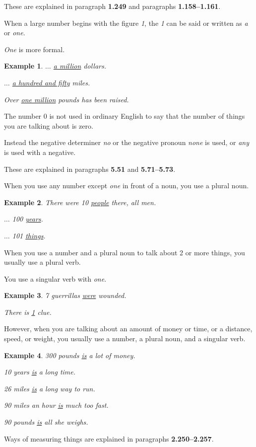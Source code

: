 \documentclass[oneside]{book}
\numberwithin{equation}{section}
\newtheorem{example}{Example}[section]
\begin{document}
These are explained in paragraph \textbf{1.249} and paragraphs \textbf{1.158--1.161}.

%
\noindent{} When a large number begins with the figure \textit{1}, the \textit{1} can be said or written as \textit{a} or \textit{one}.

\textit{One} is more formal.
\begin{example}
    $\ldots$ \underline{a million} dollars.
    
    $\ldots$ \underline{a hundred and fifty} miles.
    
    Over \underline{one million} pounds has been raised.
\end{example}
%
\noindent{} The number 0 is not used in ordinary English to say that the number of things you are talking about is zero.

Instead the negative determiner \textit{no} or the negative pronoun \textit{none} is used, or \textit{any} is used with a negative.

These are explained in paragraphs \textbf{5.51} and \textbf{5.71--5.73}.

%
\noindent{} When you use any number except \textit{one} in front of a noun, you use a plural noun.
\begin{example}
    There were 10 \underline{people} there, all men.
    
    $\ldots$ 100 \underline{years}.
    
    $\ldots$ 101 \underline{things}.
\end{example}
%
\noindent{} When you use a number and a plural noun to talk about 2 or more things, you usually use a plural verb.

You use a singular verb with \textit{one}.
\begin{example}
    7 guerrillas \underline{were} wounded.
    
    There is \underline{1} clue.
\end{example}
However, when you are talking about an amount of money or time, or a distance, speed, or weight, you usually use a number, a plural noun, and a singular verb.
\begin{example}
    300 pounds \underline{is} a lot of money.
    
    10 years \underline{is} a long time.
    
    26 miles \underline{is} a long way to run.
    
    90 miles an hour \underline{is} much too fast.
    
    90 pounds \underline{is} all she weighs.
\end{example}
Ways of measuring things are explained in paragraphs \textbf{2.250--2.257}.
\end{document}
